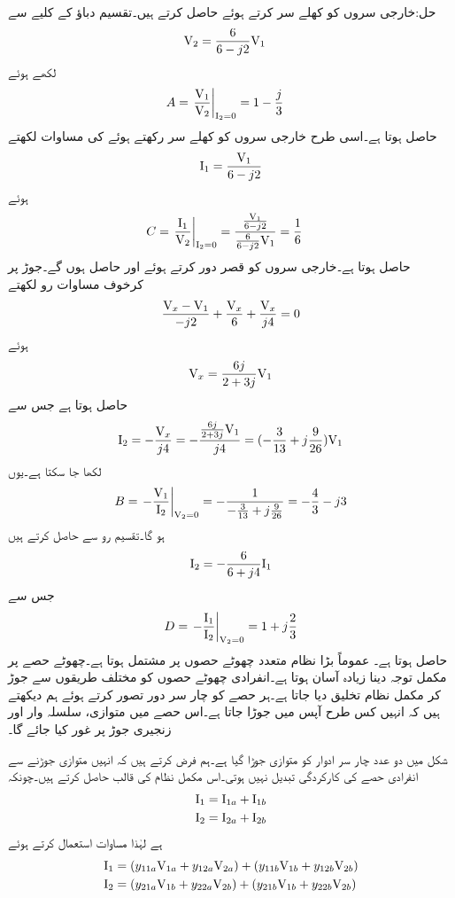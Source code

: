 حل:خارجی سروں کو کھلے سر کرتے ہوئے  حاصل کرتے ہیں۔تقسیم دباؤ کے کلیے سے
\begin{align*}
{\ensuremath{{\textup{V}}}}_2&=\frac{6}{6-j2}{{\textup{V}}}_1
\end{align*}
لکھے ہوئے 
\begin{align*}
A&=\left.\frac{{{\textup{V}}}_1}{{{\textup{V}}}_2} \right|_{{{\textup{I}}}_2=0}=1-\frac{j}{3}
\end{align*}
حاصل ہوتا ہے۔اسی طرح  خارجی سروں کو کھلے سر رکھتے ہوئے  کی مساوات لکھتے
\begin{align*}
{\ensuremath{{\textup{I}}}}_1=\frac{{{\textup{V}}}_1}{6-j2}
\end{align*} 
ہوئے
\begin{align*}
C&=\left.\frac{{{\textup{I}}}_1}{{{\textup{V}}}_2} \right|_{{{\textup{I}}}_2=0}=\frac{\frac{{{\textup{V}}}_1}{6-j2}}{\frac{6}{6-j2}{{\textup{V}}}_1}=\frac{1}{6}
\end{align*}
حاصل ہوتا ہے۔خارجی سروں کو قصر دور کرتے ہوئے  اور  حاصل ہوں گے۔جوڑ  پر کرخوف مساوات رو لکھتے
\begin{align*}
\frac{{{\textup{V}}}_x-{{\textup{V}}}_1}{-j2}+\frac{{{\textup{V}}}_x}{6}+\frac{{{\textup{V}}}_x}{j4}=0
\end{align*}
ہوئے
\begin{align*}
{\ensuremath{{\textup{V}}}}_x=\frac{6j}{2+3j}{{\textup{V}}}_1
\end{align*}
حاصل ہوتا ہے جس سے 
\begin{align*}
{\ensuremath{{\textup{I}}}}_2=-\frac{{{\textup{V}}}_x}{j4}=-\frac{\frac{6j}{2+3j}{{\textup{V}}}_1}{j4}=(-\frac{3}{13}+j\frac{9}{26}){{\textup{V}}}_1
\end{align*}
لکھا جا سکتا ہے۔یوں
\begin{align*}
B=\left. -\frac{{{\textup{V}}}_1}{{{\textup{I}}}_2}\right|_{{{\textup{V}}}_2=0}=-\frac{1}{-\frac{3}{13}+j\frac{9}{26}}=-\frac{4}{3}-j3
\end{align*}
ہو گا۔تقسیم رو سے  حاصل کرتے ہیں
\begin{align*}
{\ensuremath{{\textup{I}}}}_2=-\frac{6}{6+j4}{{\textup{I}}}_1
\end{align*}
جس سے 
\begin{align*}
D=\left. -\frac{{{\textup{I}}}_1}{{{\textup{I}}}_2}\right|_{{{\textup{V}}}_2=0}=1+j\frac{2}{3}
\end{align*}
حاصل ہوتا ہے۔
عموماً بڑا نظام متعدد چھوٹے حصوں پر مشتمل ہوتا ہے۔چھوٹے حصے پر مکمل توجہ دینا زیادہ آسان ہوتا ہے۔انفرادی چھوٹے حصوں کو مختلف طریقوں سے جوڑ کر مکمل نظام تخلیق دیا جاتا ہے۔ہر حصے کو چار سر دور تصور  کرتے ہوئے ہم دیکھتے ہیں کہ انہیں کس طرح آپس میں جوڑا جاتا ہے۔اس حصے میں متوازی، سلسلہ وار اور زنجیری جوڑ پر غور کیا جائے گا۔

شکل  میں دو عدد چار سر ادوار کو متوازی جوڑا گیا ہے۔ہم فرض کرتے ہیں کہ انہیں متوازی جوڑنے سے انفرادی حصے کی کارکردگی تبدیل نہیں ہوتی۔اس مکمل نظام کی  قالب حاصل کرتے ہیں۔چونکہ
\begin{align*}
{\ensuremath{{\textup{I}}}}_1&={{\textup{I}}}_{1a}+{{\textup{I}}}_{1b}\\
{{\textup{I}}}_2&={{\textup{I}}}_{2a}+{{\textup{I}}}_{2b}
\end{align*}
ہے لہٰذا مساوات  استعمال کرتے ہوئے
\begin{align*}
{\ensuremath{{\textup{I}}}}_1&=(y_{11a}{{\textup{V}}}_{1a}+y_{12a}{{\textup{V}}}_{2a})+(y_{11b}{{\textup{V}}}_{1b}+y_{12b}{{\textup{V}}}_{2b})\\
{{\textup{I}}}_2&=(y_{21a}{{\textup{V}}}_{1b}+y_{22a}{{\textup{V}}}_{2b})+(y_{21b}{{\textup{V}}}_{1b}+y_{22b}{{\textup{V}}}_{2b})
\end{align*}

